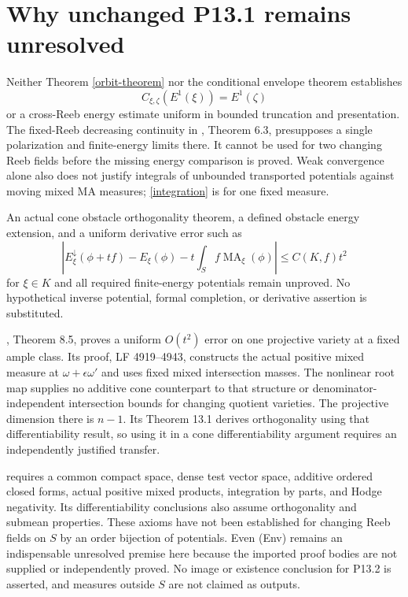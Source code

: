 \documentclass[11pt]{article}
\newcommand{\MA}{\operatorname{MA}}
\begin{document}
\section{Why unchanged P13.1 remains unresolved}
Neither Theorem \ref{orbit-theorem} nor the conditional envelope theorem establishes
\[
 C_{\xi,\zeta}(E^1(\xi))=E^1(\zeta)
\]
or a cross-Reeb energy estimate uniform in bounded truncation and presentation.
The fixed-Reeb decreasing continuity in \cite{YW24}, Theorem 6.3, presupposes a single polarization and finite-energy limits there.
It cannot be used for two changing Reeb fields before the missing energy comparison is proved.
Weak convergence alone also does not justify integrals of unbounded transported potentials against moving mixed MA measures; \eqref{integration} is for one fixed measure.

An actual cone obstacle orthogonality theorem, a defined obstacle energy extension, and a uniform derivative error such as
\[
 \left|E_\xi^\downarrow(\phi+tf)-E_\xi(\phi)
   -t\int_Sf\MA_\xi(\phi)\right|\leq C(K,f)t^2
\]
for $\xi\in K$ and all required finite-energy potentials remain unproved.
No hypothetical inverse potential, formal completion, or derivative assertion is substituted.

\cite{BJ22}, Theorem 8.5, proves a uniform $O(t^2)$ error on one projective variety at a fixed ample class.
Its proof, LF 4919--4943, constructs the actual positive mixed measure at $\omega+\epsilon\omega'$ and uses fixed mixed intersection masses.
The nonlinear root map supplies no additive cone counterpart to that structure or denominator-independent intersection bounds for changing quotient varieties.
The projective dimension there is $n-1$.
Its Theorem 13.1 derives orthogonality using that differentiability result, so using it in a cone differentiability argument requires an independently justified transfer.

\cite{BJ23} requires a common compact space, dense test vector space, additive ordered closed forms, actual positive mixed products, integration by parts, and Hodge negativity.
Its differentiability conclusions also assume orthogonality and submean properties.
These axioms have not been established for changing Reeb fields on $S$ by an order bijection of potentials.
Even (Env) remains an indispensable unresolved premise here because the imported proof bodies are not supplied or independently proved.
No image or existence conclusion for P13.2 is asserted, and measures outside $S$ are not claimed as outputs.
\end{document}
